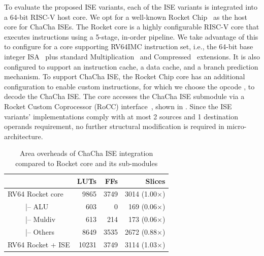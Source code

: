 To evaluate the proposed ISE variants, each of the ISE variants is integrated into a 64-bit RISC-V host core. 
We opt for a well-known Rocket Chip~\cite{rocket:16} as the host core for ChaCha ISEs. 
The Rocket core is a highly configurable RISC-V core that executes instructions using a 5-stage, in-order pipeline. 
We take advantage of this to configure for a core supporting RV64IMC instruction set, i.e., the 64-bit base integer ISA~\cite[Chapter 5]{RV:ISA:I} plus standard Multiplication~\cite[Chapter 7]{RV:ISA:I} and Compressed~\cite[Chapter 16]{RV:ISA:I} extensions. It is also configured to support an instruction cache, a data cache, and a branch prediction mechanism.
To support ChaCha ISE, the Rocket Chip core has an additional configuration to enable custom instructions, for which we choose the  opcode \cite[Chapter 25]{RV:ISA:I}, to decode the ChaCha ISE.
The core accesses the ChaCha ISE submodule via a Rocket Custom Coprocessor (RoCC) interface~\cite[Section 4]{rocket:16}, shown in . Since the ISE variants' implementations 
comply with at most 2 sources and 1 destination operands requirement, no further structural modification is required in micro-architecture. 

\begin{table}
	\caption{Area overheads of ChaCha ISE integration compared to Rocket core and its sub-modules}
	\label{tab:res:hardcost2}
    \centering
	\begin{tabular}{lrrr}
		\toprule            
		                 &     LUTs   &   FFs  &   Slices \\
		\midrule
		RV64 Rocket core  &    9865   &  3749  & 3014 (1.00$\times$)\\
		~~~~~|-- ALU      &     603   &     0  &  169 (0.06$\times$) \\
		~~~~~|-- Muldiv   &     613   &   214  &  173 (0.06$\times$)\\
		~~~~~|-- Others   &    8649   &  3535  & 2672 (0.88$\times$)\\
		RV64 Rocket + ISE &   10231   &  3749  & 3114 (1.03$\times$)\\ 
		
		\bottomrule
	\end{tabular} 
\end{table}

